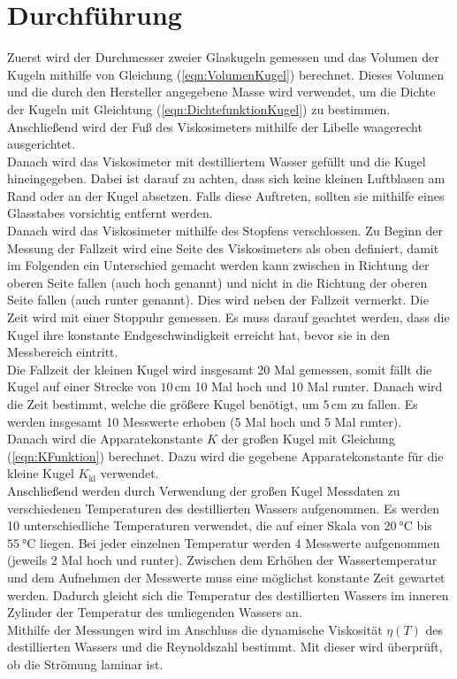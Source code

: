 \section{Durchführung}
\label{sec:Durchführung}
Zuerst wird der Durchmesser zweier Glaskugeln gemessen und das Volumen der Kugeln mithilfe von Gleichung
(\ref{eqn:VolumenKugel}) berechnet. Dieses Volumen und die durch den Hersteller angegebene Masse 
wird verwendet, um die Dichte der Kugeln mit Gleichtung 
(\ref{eqn:DichtefunktionKugel}) zu bestimmen.  
Anschließend wird der Fuß des Viskosimeters mithilfe der Libelle waagerecht ausgerichtet. \\
Danach wird das Viskosimeter mit destilliertem Wasser gefüllt und die Kugel hineingegeben. 
Dabei ist darauf zu achten, dass sich keine kleinen Luftblasen am Rand oder an der Kugel absetzen. 
Falls diese Auftreten, sollten sie mithilfe eines Glasstabes vorsichtig entfernt werden. \\
Danach wird 
das Viskosimeter mithilfe des Stopfens verschlossen. Zu Beginn der Messung der Fallzeit wird eine Seite 
des Viskosimeters als oben definiert, damit im Folgenden ein Unterschied gemacht werden kann zwischen 
\glqq in Richtung der oberen Seite fallen\grqq{} (auch \glqq hoch\grqq{} genannt) und \glqq nicht in die Richtung der 
oberen Seite fallen\grqq{}
(auch \glqq runter\grqq{} genannt). Dies wird neben der Fallzeit vermerkt. Die Zeit wird mit einer Stoppuhr gemessen. 
Es muss darauf geachtet werden, dass
die Kugel ihre konstante Endgeschwindigkeit erreicht hat, bevor sie in den Messbereich eintritt.\\ 
Die Fallzeit der kleinen Kugel wird insgesamt 20 Mal gemessen, somit fällt die Kugel auf einer Strecke 
von $10\,\unit{\centi\meter}$ 10 Mal \glqq hoch\grqq{} und 10 Mal \glqq runter\grqq{}. 
Danach wird die Zeit bestimmt, welche die größere Kugel benötigt, um $5\,\unit{\centi\meter}$ zu fallen.
Es werden insgesamt 10 Messwerte erhoben (5 Mal \glqq hoch\grqq{} und 5 Mal \glqq runter\grqq{}).\\
Danach wird die Apparatekonstante $K$ der großen Kugel mit Gleichung (\ref{eqn:KFunktion}) berechnet. Dazu wird die gegebene 
Apparatekonstante für die kleine Kugel $K_{\text{kl}}$ %
verwendet. \\
Anschließend werden durch Verwendung der großen Kugel Messdaten zu verschiedenen Temperaturen des 
destillierten Wassers aufgenommen. 
Es werden 10 unterschiedliche Temperaturen verwendet, die auf einer Skala von $\SI{20}{\celsius}$ bis 
$\SI{55}{\celsius}$ liegen. Bei jeder einzelnen Temperatur werden 4 Messwerte aufgenommen (jeweils 2 Mal 
\glqq hoch\grqq{} und \glqq runter\grqq{}).
Zwischen dem Erhöhen der Wassertemperatur und dem Aufnehmen der Messwerte muss eine möglichst konstante Zeit 
gewartet werden. Dadurch gleicht sich die Temperatur des destillierten Wassers im inneren Zylinder der Temperatur des umliegenden 
Wassers an. \\
Mithilfe der Messungen wird im Anschluss die dynamische Viskosität $\eta(T)$ des destillierten Wassers und die 
Reynoldszahl bestimmt. Mit dieser wird überprüft, ob die Strömung laminar ist.

